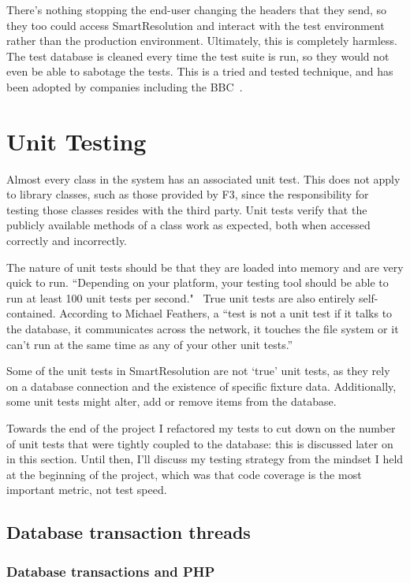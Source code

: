 There's nothing stopping the end-user changing the headers that they send, so they too could access SmartResolution and interact with the test environment rather than the production environment. Ultimately, this is completely harmless. The test database is cleaned every time the test suite is run, so they would not even be able to sabotage the tests. This is a tried and tested technique, and has been adopted by companies including the BBC~\cite{bbc:cucumber}.

\section{Unit Testing}

Almost every class in the system has an associated unit test. This does not apply to library classes, such as those provided by F3, since the responsibility for testing those classes resides with the third party. Unit tests verify that the publicly available methods of a class work as expected, both when accessed correctly and incorrectly.

The nature of unit tests should be that they are loaded into memory and are very quick to run. ``Depending on your platform, your testing tool should be able to run at least 100 unit tests per second."~\cite{artOfAgile} True unit tests are also entirely self-contained. According to Michael Feathers, a ``test is not a unit test if it talks to the database, it communicates across the network, it touches the file system or it can't run at the same time as any of your other unit tests.''~\cite{feathers:unitTests}

Some of the unit tests in SmartResolution are not `true' unit tests, as they rely on a database connection and the existence of specific fixture data. Additionally, some unit tests might alter, add or remove items from the database.

Towards the end of the project I refactored my tests to cut down on the number of unit tests that were tightly coupled to the database: this is discussed later on in this section. Until then, I'll discuss my testing strategy from the mindset I held at the beginning of the project, which was that code coverage is the most important metric, not test speed.

\subsection{Database transaction threads}

\subsubsection{Database transactions and PHP}

